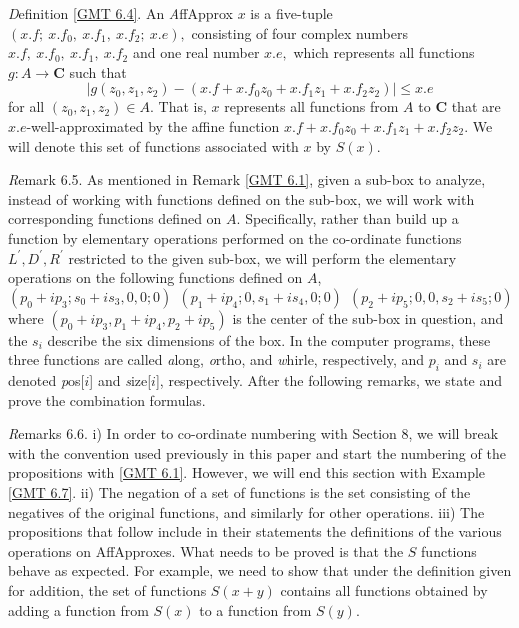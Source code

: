  {\textit Definition {\textrm \ref{GMT 6.4}}}.  An {\textit AffApprox}  $x$ is a five-tuple
$(x.f;\ x.f_0,\ x.f_1,\ x.f_2;\ x.e),$
consisting of four complex numbers $x.f,\ x.f_0,\ x.f_1,\ x.f_2$ and one real number $x.e,$  which represents all functions 
$g: A \rightarrow {\mathbf C}$ such that
$$|g(z_0,z_1,z_2) - (x.f + x.f_0 z_0 + x.f_1 z_1 + x.f _2 z_2)| \le x.e$$
for all $(z_0,z_1,z_2) \in A.$  That is, $x$ represents all functions from $A$ to ${\mathbf C}$ that are $x.e$-well-approximated by the affine function $x.f + x.f_0 z_0 + x.f_1 z_1 + x.f _2 z_2$.  We will denote this set of functions associated with $x$ by $S(x)$.

{\textit Remark} 6.5.
As mentioned in Remark \ref{GMT 6.1}, given a sub-box to analyze, instead of working with functions defined on the sub-box, we will work with corresponding functions defined on $A.$  Specifically, rather than build up a function by elementary operations performed on the co-ordinate functions 
$L^{\prime}, D^{\prime}, R^{\prime}$ 
restricted to the given sub-box, we will perform the elementary operations on the following functions defined on $A$, 
$$(p_0 + i p_3; s_0 + i s_3,0,0; 0)\  \ (p_1 + i p_4; 0, s_1 + i s_4,0;0) \   \ (p_2 + i p_5; 0,0, s_2 + i s_5; 0)$$
where $(p_0 + i p_3, p_1 + i p_4, p_2 + i p_5)$ is the center of the sub-box in question, and the $s_i$ describe the six dimensions of the box. In the computer programs, these three functions are called {\textit along}, {\textit ortho}, and {\textit whirle,} respectively, and $p_i$ and $s_i$
 are denoted {\textit pos}[$i$] and {\textit size}[$i$], respectively.
After the following remarks, we state and prove the combination formulas. 

 {\textit Remarks} 6.6.
i) In order to co-ordinate numbering with Section 8, we will break with the convention used previously in this paper and start the
numbering of the propositions with \ref{GMT 6.1}. However, we will end this section with Example \ref{GMT 6.7}.
ii)  The negation of a set of functions is the set consisting of the negatives of the original functions, and similarly for other operations.
iii)  The propositions that follow include in their statements the definitions of the various operations on AffApproxes.  What needs to
be proved is that the $S$ functions behave as expected.  For example, we need to show that under the definition given for addition, the
set of functions $S(x+y)$ contains all functions obtained by adding a function from $S(x)$ to a function from $S(y).$

